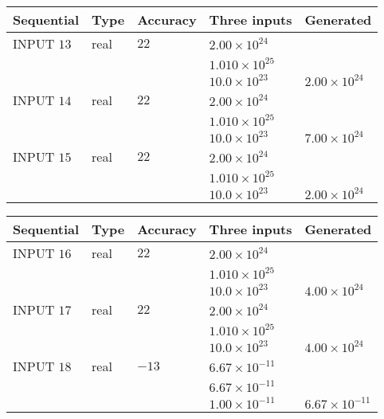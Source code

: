 \documentclass[12pt]{article}
\begin{document}
   
  
  
\noindent\begin{tabular}{|l|l|l|l|l|}
\hline
 Sequential & Type & Accuracy & Three inputs & Generated \\ 
\hline
 
 
  INPUT $          13$ & real & $          22 $ & $
 2.00 \times 10^{24}
  $ & \\
  & & &  $
 1.010 \times 10^{25}
  $ & \\
  & & &  $
 10.0 \times 10^{23}
 $ & $ 2.00 \times 10^{24} $ 
 \\  \hline  
 
 
  INPUT $          14$ & real & $          22 $ & $
 2.00 \times 10^{24}
  $ & \\
  & & &  $
 1.010 \times 10^{25}
  $ & \\
  & & &  $
 10.0 \times 10^{23}
 $ & $ 7.00 \times 10^{24} $ 
 \\  \hline  
 
 
  INPUT $          15$ & real & $          22 $ & $
 2.00 \times 10^{24}
  $ & \\
  & & &  $
 1.010 \times 10^{25}
  $ & \\
  & & &  $
 10.0 \times 10^{23}
 $ & $ 2.00 \times 10^{24} $ 
 \\  \hline  
 \end{tabular}
   
   
  
  
\noindent\begin{tabular}{|l|l|l|l|l|}
\hline
 Sequential & Type & Accuracy & Three inputs & Generated \\ 
\hline
 
 
  INPUT $          16$ & real & $          22 $ & $
 2.00 \times 10^{24}
  $ & \\
  & & &  $
 1.010 \times 10^{25}
  $ & \\
  & & &  $
 10.0 \times 10^{23}
 $ & $ 4.00 \times 10^{24} $ 
 \\  \hline  
 
 
  INPUT $          17$ & real & $          22 $ & $
 2.00 \times 10^{24}
  $ & \\
  & & &  $
 1.010 \times 10^{25}
  $ & \\
  & & &  $
 10.0 \times 10^{23}
 $ & $ 4.00 \times 10^{24} $ 
 \\  \hline  
 
 
  INPUT $          18$ & real & $         -13 $ & $
 6.67 \times 10^{-11}
  $ & \\
  & & &  $
 6.67 \times 10^{-11}
  $ & \\
  & & &  $
 1.00 \times 10^{-11}
 $ & $ 6.67 \times 10^{-11} $ 
 \\  \hline  
 \end{tabular}
   
\end{document}
